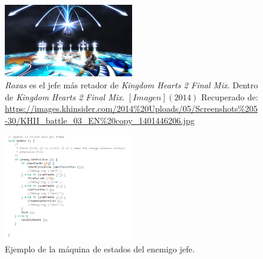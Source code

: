 			\begin{figure}[h]
    			\centering
    			\includegraphics[width=0.5\textwidth]{03TrabajoRealizado/imagenes/RoxasBoss.jpg}
    			\caption{\textit{Roxas} es el jefe más retador de \textit{Kingdom Hearts 2 Final Mix}. Dentro de \textit{Kingdom Hearts 2 Final Mix}. $ [Imagen] (2014)$ Recuperado de: \url{https://images.khinsider.com/2014\%20Uploads/05/Screenshots\%205-30/KHII_battle_03_EN\%20copy_1401446206.jpg}}
    			\label{fig:Roxas}
			\end{figure}

			\begin{figure}[h]
    			\centering
    			\includegraphics[width=0.5\textwidth]{03TrabajoRealizado/imagenes/ActualMaquinaJefe.png}
    			\caption{Ejemplo de la máquina de estados del enemigo jefe.}
    			\label{fig:EnemyMaquina}
			\end{figure}

